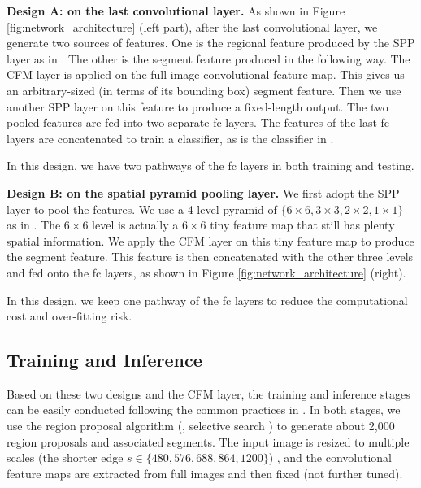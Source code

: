 \documentclass[10pt,twocolumn,letterpaper]{article}
\begin{document}
\vspace{6pt}
\noindent\textbf{Design A: on the last convolutional layer.} As shown in Figure \ref{fig:network_architecture} (left part), after the last convolutional layer, we generate two sources of features. One is the regional feature produced by the SPP layer as in \cite{he2014spatial}. The other is the segment feature produced in the following way. The CFM layer is applied on the full-image convolutional feature map. This gives us an arbitrary-sized (in terms of its bounding box) segment feature. Then we use another SPP layer on this feature to produce a fixed-length output. The two pooled features are fed into two separate fc layers. The features of the last fc layers are concatenated to train a classifier, as is the classifier in \cite{hariharan2014simultaneous}.

In this design, we have two pathways of the fc layers in both training and testing.

\vspace{6pt}
\noindent\textbf{Design B: on the spatial pyramid pooling layer.}
We first adopt the SPP layer \cite{he2014spatial} to pool the features. We use a 4-level pyramid of $\{6 \times 6, 3 \times 3, 2 \times 2, 1 \times 1\}$ as in \cite{he2014spatial}. The $6 \times 6$ level is actually a $6 \times 6$ tiny feature map that still has plenty spatial information. We apply the CFM layer on this tiny feature map to produce the segment feature. This feature is then concatenated with the other three levels and fed onto the fc layers, as shown in Figure \ref{fig:network_architecture} (right).

In this design, we keep one pathway of the fc layers to reduce the computational cost and over-fitting risk.

\subsection{Training and Inference}
\label{sec:training_and_inference}

Based on these two designs and the CFM layer, the training and inference stages can be easily conducted following the common practices in \cite{girshick2013rich,he2014spatial,hariharan2014simultaneous}. In both stages, we use the region proposal algorithm (\eg, selective search \cite{uijlings2013selective}) to generate about 2,000 region proposals and associated segments. The input image is resized to multiple scales (the shorter edge $s \in \{480, 576, 688, 864, 1200\}$) \cite{he2014spatial}, and the convolutional feature maps are extracted from full images and then fixed (not further tuned).
\end{document}
